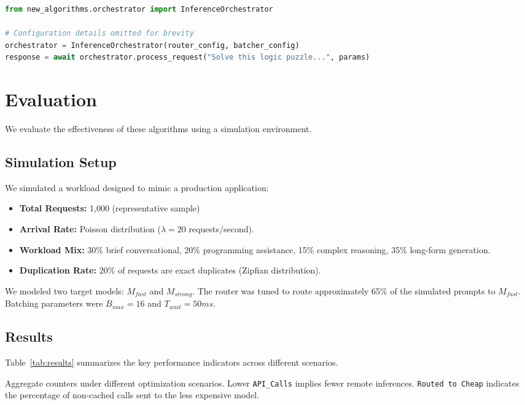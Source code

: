\documentclass[11pt]{article}
\begin{document}
\begin{lstlisting}[language=Python, caption=Example usage of the integrated orchestrator]
from new_algorithms.orchestrator import InferenceOrchestrator

# Configuration details omitted for brevity
orchestrator = InferenceOrchestrator(router_config, batcher_config)
response = await orchestrator.process_request("Solve this logic puzzle...", params)
\end{lstlisting}

\section{Evaluation}
We evaluate the effectiveness of these algorithms using a simulation environment.

\subsection{Simulation Setup}
We simulated a workload designed to mimic a production application:
\begin{itemize}
    \item \textbf{Total Requests:} 1,000 (representative sample)
    \item \textbf{Arrival Rate:} Poisson distribution ($\lambda=20$ requests/second).
    \item \textbf{Workload Mix:} 30\% brief conversational, 20\% programming assistance, 15\% complex reasoning, 35\% long-form generation.
    \item \textbf{Duplication Rate:} 20\% of requests are exact duplicates (Zipfian distribution).
\end{itemize}
We modeled two target models: $M_{fast}$ and $M_{strong}$. The router was tuned to route approximately 65\% of the simulated prompts to $M_{fast}$. Batching parameters were $B_{max}=16$ and $T_{wait}=50ms$.

\subsection{Results}
Table~\ref{tab:results} summarizes the key performance indicators across different scenarios.

\begin{table}[h]
\centering

\caption{Aggregate counters under different optimization scenarios. Lower \texttt{API\_Calls} implies fewer remote inferences. \texttt{Routed to Cheap} indicates the percentage of non-cached calls sent to the less expensive model.}
\label{tab:results}
\end{table}
\end{document}

